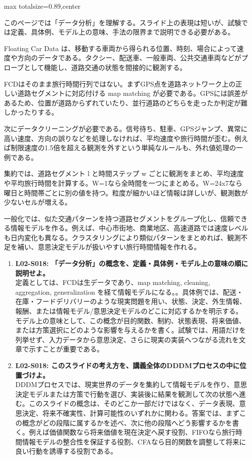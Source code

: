 \begin{minipage}[t]{0.58\textwidth}
\begin{adjustbox}{max totalsize={\textwidth}{0.89\textheight},center}
\begin{minipage}{\textwidth}\scriptsize
{}このページでは「データ分析」を理解する。スライド上の表現は短いが、試験では定義、具体例、モデル上の意味、手法の限界まで説明できる必要がある。\par
Floating Car Data は、移動する車両から得られる位置、時刻、場合によって速度や方向のデータである。タクシー、配送車、一般車両、公共交通車両などがプローブとして機能し、道路交通の状態を間接的に観測する。\par
FCDはそのまま旅行時間行列ではない。まずGPS点を道路ネットワーク上の正しい道路セグメントに対応付ける map matching が必要である。GPSには誤差があるため、位置が道路からずれていたり、並行道路のどちらを走ったか判定が難しかったりする。\par
次にデータクリーニングが必要である。信号待ち、駐車、GPSジャンプ、異常に高い速度、方向の誤りなどを処理しなければ、平均速度や旅行時間が歪む。例えば制限速度の1.5倍を超える観測を外すという単純なルールも、外れ値処理の一例である。\par
集約では、道路セグメント l と時間ステップ w ごとに観測をまとめ、平均速度や平均旅行時間を計算する。W=1なら全時間を一つにまとめる。W=24x7なら曜日と時間帯ごとに別の値を持つ。粒度が細かいほど情報は詳しいが、観測数が少ないセルが増える。\par
一般化では、似た交通パターンを持つ道路セグメントをグループ化し、信頼できる情報モデルを作る。例えば、中心市街地、商業地区、高速道路では速度レベルも日内変化も異なる。クラスタリングにより類似パターンをまとめれば、観測不足を補い、意思決定モデルが扱いやすい旅行時間情報を作れる。\par{}\begin{enumerate}\item \textbf{L02-S018: 「データ分析」の概念を、定義・具体例・モデル上の意味の順に説明せよ。}\\定義としては、FCDは生データであり、map matching, cleaning, aggregation, generalization を経て情報モデルになる。。具体例では、配送・在庫・フードデリバリーのような現実問題を用い、状態、決定、外生情報、報酬、または情報モデル/意思決定モデルのどこに対応するかを明示する。モデル上の意味として、この概念が目的関数、制約、状態表現、将来価値、または方策選択にどのような影響を与えるかを書く。試験では、用語だけを列挙せず、入力データから意思決定、さらに現実の実装へつながる流れを文章で示すことが重要である。\item \textbf{L02-S018: このスライドの考え方を、講義全体のDDDMプロセスの中に位置づけよ。}\\DDDMプロセスでは、現実世界のデータを集約して情報モデルを作り、意思決定モデルまたは方策で行動を選び、実装後に結果を観測して次の状態へ進む。このスライドの概念は、そのどこか一部だけではなく、データ表現、意思決定、将来不確実性、計算可能性のいずれかに関わる。答案では、まずこの概念がどの段階に属するかを述べ、次に他の段階へどう影響するかを書く。例えば価値関数なら将来価値を現在決定へ戻す役割、FIFOなら旅行時間情報モデルの整合性を保証する役割、CFAなら目的関数を調整して将来に良い行動を誘導する役割である。\end{enumerate}

\end{minipage}
\end{adjustbox}
\end{minipage}
